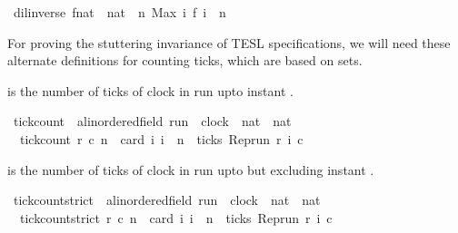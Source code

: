 \begin{isabellebody}
\ {\isacartoucheopen}dil{\isacharunderscore}inverse\ f{\isacharcolon}{\isacharcolon}{\isacharparenleft}nat\ {\isasymRightarrow}\ nat{\isacharparenright}\ {\isasymequiv}\ {\isacharparenleft}{\isasymlambda}n{\isachardot}\ Max\ {\isacharbraceleft}i{\isachardot}\ f\ i\ {\isasymle}\ n{\isacharbraceright}{\isacharparenright}{\isacartoucheclose}%
\isadelimdocument
%
\endisadelimdocument
%
\isatagdocument
%
\isamarkuptrue%
%
\endisatagdocument
{\isafolddocument}%
%
\isadelimdocument
%
\endisadelimdocument
%
\begin{isamarkuptext}%
For proving the stuttering invariance of TESL specifications, we will need
  these alternate definitions for counting ticks, which are based on sets.%
\end{isamarkuptext}\isamarkuptrue%
%
\begin{isamarkuptext}%
 is the number of ticks of clock  in 
  run  upto instant .%
\end{isamarkuptext}\isamarkuptrue%
\isamarkupfalse%
\ tick{\isacharunderscore}count\ {\isacharcolon}{\isacharcolon}\ {\isacartoucheopen}{\isacharprime}a{\isacharcolon}{\isacharcolon}linordered{\isacharunderscore}field\ run\ {\isasymRightarrow}\ clock\ {\isasymRightarrow}\ nat\ {\isasymRightarrow}\ nat{\isacartoucheclose}\isanewline
{}\isanewline
\ \ {\isacartoucheopen}tick{\isacharunderscore}count\ r\ c\ n\ {\isacharequal}\ card\ {\isacharbraceleft}i{\isachardot}\ i\ {\isasymle}\ n\ {\isasymand}\ ticks\ {\isacharparenleft}{\isacharparenleft}Rep{\isacharunderscore}run\ r{\isacharparenright}\ i\ c{\isacharparenright}{\isacharbraceright}{\isacartoucheclose}%
\begin{isamarkuptext}%
 is the number of ticks of clock  
  in run  upto but excluding instant .%
\end{isamarkuptext}\isamarkuptrue%
\isamarkupfalse%
\ tick{\isacharunderscore}count{\isacharunderscore}strict\ {\isacharcolon}{\isacharcolon}\ {\isacartoucheopen}{\isacharprime}a{\isacharcolon}{\isacharcolon}linordered{\isacharunderscore}field\ run\ {\isasymRightarrow}\ clock\ {\isasymRightarrow}\ nat\ {\isasymRightarrow}\ nat{\isacartoucheclose}\isanewline
{}\isanewline
\ \ {\isacartoucheopen}tick{\isacharunderscore}count{\isacharunderscore}strict\ r\ c\ n\ {\isacharequal}\ card\ {\isacharbraceleft}i{\isachardot}\ i\ {\isacharless}\ n\ {\isasymand}\ ticks\ {\isacharparenleft}{\isacharparenleft}Rep{\isacharunderscore}run\ r{\isacharparenright}\ i\ c{\isacharparenright}{\isacharbraceright}{\isacartoucheclose}\isanewline
\isanewline
%
\isadelimtheory
\isanewline
%
\endisadelimtheory
%
\isatagtheory
{}\isamarkupfalse%
%
\endisatagtheory
{\isafoldtheory}%
%
\isadelimtheory
%
\endisadelimtheory
%
\end{isabellebody}%
